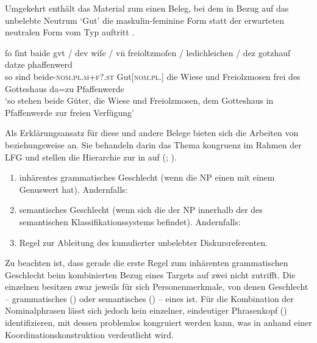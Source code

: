 Umgekehrt enthält das Material zum \CAO{} einen Beleg, bei dem in
Bezug auf das un\-belebte Neutrum  `Gut' die maskulin-feminine
Form  statt der erwarteten neutralen Form vom Typ 
auftritt .

\begin{exe}
\ex\label{ex:1584_gut2}
	\gll ſo ſint baide gvt / dev wiſe / vn̄ freioltzmoſen /
			ledichleichen / dez gotzhauſ datze phaffenwerd \\
		so sind beide-\textsc{nom.pl.m+f?\subI.st} Gut[\textsc{nom.pl.\NeutI}]
			{} die Wiese {} und Freiolzmosen {} frei {} des Gotteshaus da=zu
			Pfaffenwerde \\
	\trans `so stehen beide Güter, die Wiese und Freiolzmosen, dem Gotteshaus
		in Pfaffenwerde zur freien Verfügung'
		\parencites(Nr.~1584, Kl.~Herrenchiemsee, Kr.~Rosenheim, 1292)[727,26--27]{cao2}
\end{exe}

Als Erklärungsansatz für diese und andere Belege bieten sich die Arbeiten von
\citet[171--195]{wechslerzlatic2003} beziehungsweise \citet{wechsler2009} an.
Sie behandeln darin das Thema \-kongruenz im Rahmen der
LFG
\autocites(vgl.~){bresnanetal2016} und stellen die
Hierarchie zur  in  auf (; \cites[584]{wechsler2009}[195]{wechslerzlatic2003}).

\begin{exe}
\ex\label{ex:gendasshier}
	\begin{enumerate}[noitemsep]
		\item inhärentes grammatisches Geschlecht (wenn die
			NP einen  mit einem Genuswert
			hat). Andernfalls:
		\item semantisches Geschlecht (wenn sich die  der NP
			innerhalb der  des semantischen Klassifikationssystems
			befindet). Andernfalls:
		\item Regel zur Ableitung des  kumulierter
			unbelebter Diskursreferenten.
	\end{enumerate}
\end{exe}

Zu beachten ist, dass gerade die erste Regel zum inhärenten grammatischen
Geschlecht beim kombinierten Bezug eines Targets auf zwei
 nicht zutrifft. Die einzelnen  besitzen zwar
jeweils für sich Personenmerkmale, von denen Geschlecht --
grammatisches () oder semantisches () -- eines ist. Für
die Kombination der Nominalphrasen lässt sich jedoch kein
einzelner, eindeutiger Phrasenkopf ()
identifizieren, mit dessen  problemlos
kongruiert werden kann, was in  anhand einer
Koordinations\-konstruktion verdeutlicht wird.

